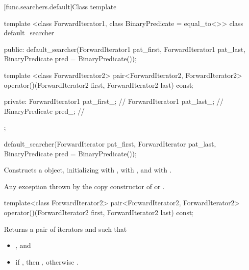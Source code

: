 [func.searchers.default]{Class template }

%
\begin{codeblock}
template <class ForwardIterator1, class BinaryPredicate = equal_to<>>
class default_searcher {
public:
  default_searcher(ForwardIterator1 pat_first, ForwardIterator1 pat_last,
                   BinaryPredicate pred = BinaryPredicate());

  template <class ForwardIterator2>
    pair<ForwardIterator2, ForwardIterator2>
      operator()(ForwardIterator2 first, ForwardIterator2 last) const;

private:
  ForwardIterator1 pat_first_; // \expos
  ForwardIterator1 pat_last_;  // \expos
  BinaryPredicate pred_;       // \expos
};
\end{codeblock}

%
\begin{itemdecl}
default_searcher(ForwardIterator pat_first, ForwardIterator pat_last,
                 BinaryPredicate pred = BinaryPredicate());
\end{itemdecl}

\begin{itemdescr}
\pnum
\effects
Constructs a  object, initializing 
with , \mbox{} with , and
 with .

\pnum
\throws
Any exception thrown by the copy constructor of  or
.
\end{itemdescr}

%
\begin{itemdecl}
template<class ForwardIterator2>
  pair<ForwardIterator2, ForwardIterator2>
    operator()(ForwardIterator2 first, ForwardIterator2 last) const;
\end{itemdecl}

\begin{itemdescr}
\pnum
\effects
Returns a pair of iterators  and  such that
\begin{itemize}
\item {}, and
\item if , then ,
otherwise .
\end{itemize}
\end{itemdescr}

